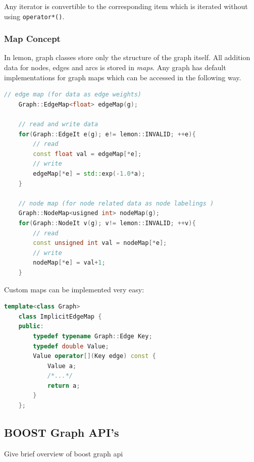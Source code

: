     Any iterator is convertible to the corresponding item which
    is iterated without using \lstinline{operator*()}.

\subsubsection{Map Concept}

    In lemon, graph classes store only the structure of the graph itself.
    All addition data for nodes, edges and arcs is stored 
    in \emph{maps}. 
    Any graph has default implementations for graph maps which
    can be accessed in the following way.

    \begin{minipage}{\textwidth}\vspace{-0.75cm}\begin{lstlisting}[language=c++]
    // edge map (for data as edge weights)
    Graph::EdgeMap<float> edgeMap(g); 

    // read and write data 
    for(Graph::EdgeIt e(g); e!= lemon::INVALID; ++e){
        // read
        const float val = edgeMap[*e];
        // write
        edgeMap[*e] = std::exp(-1.0*a);
    }

    // node map (for node related data as node labelings )
    Graph::NodeMap<usigned int> nodeMap(g);
    for(Graph::NodeIt v(g); v!= lemon::INVALID; ++v){
        // read
        const unsigned int val = nodeMap[*e];
        // write
        nodeMap[*e] = val+1;
    }
    \end{lstlisting}\end{minipage}\vspace{0.5cm}


    Custom maps can be implemented very easy:

    \begin{minipage}{\textwidth}\vspace{-0.75cm}\begin{lstlisting}[language=c++]
    template<class Graph>
    class ImplicitEdgeMap {
    public:
        typedef typename Graph::Edge Key;
        typedef double Value;
        Value operator[](Key edge) const { 
            Value a;
            /*...*/
            return a;
        }
    };
    \end{lstlisting}\end{minipage}\vspace{0.5cm}

\subsection{BOOST Graph API's}\label{sec:boost_graph_apis}
Give brief overview of boost graph api





